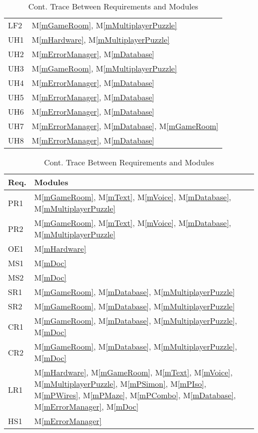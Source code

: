 \documentclass[12pt, titlepage]{article}
\newcommand{\mref}[1]{M\ref{#1}}
\begin{document}
\begin{table}[H]
\begin{tabular}{p{} p{}}
LF2 & \mref{mGameRoom}, \mref{mMultiplayerPuzzle}\\
UH1 & \mref{mHardware}, \mref{mMultiplayerPuzzle}\\
UH2 & \mref{mErrorManager}, \mref{mDatabase}\\
UH3 & \mref{mGameRoom}, \mref{mMultiplayerPuzzle}\\
UH4 & \mref{mErrorManager}, \mref{mDatabase}\\
UH5 & \mref{mErrorManager}, \mref{mDatabase}\\
UH6 & \mref{mErrorManager}, \mref{mDatabase}\\
UH7 & \mref{mErrorManager}, \mref{mDatabase}, \mref{mGameRoom}\\
UH8 & \mref{mErrorManager}, \mref{mDatabase}\\


\bottomrule
\end{tabular}
\caption{Cont. Trace Between Requirements and Modules}
\label{TblRT2}
\end{table}

\begin{table}[H]
\centering
\begin{tabular}{p{} p{}}
\toprule
\textbf{Req.} & \textbf{Modules}\\
\midrule
PR1 & \mref{mGameRoom}, \mref{mText}, \mref{mVoice}, \mref{mDatabase}, \mref{mMultiplayerPuzzle}\\
PR2 & \mref{mGameRoom}, \mref{mText}, \mref{mVoice}, \mref{mDatabase}, \mref{mMultiplayerPuzzle}\\
OE1     & \mref{mHardware}\\
MS1& \mref{mDoc}\\
MS2& \mref{mDoc}\\
SR1 & \mref{mGameRoom}, \mref{mDatabase}, \mref{mMultiplayerPuzzle}\\
SR2 & \mref{mGameRoom}, \mref{mDatabase}, \mref{mMultiplayerPuzzle}\\
CR1 & \mref{mGameRoom}, \mref{mDatabase}, \mref{mMultiplayerPuzzle}, \mref{mDoc}\\
CR2 & \mref{mGameRoom}, \mref{mDatabase}, \mref{mMultiplayerPuzzle}, \mref{mDoc}\\
LR1     & \mref{mHardware}, \mref{mGameRoom}, \mref{mText}, \mref{mVoice},  \mref{mMultiplayerPuzzle}, \mref{mPSimon}, \mref{mPIso}, \mref{mPWires}, \mref{mPMaze}, \mref{mPCombo}, \mref{mDatabase}, \mref{mErrorManager}, \mref{mDoc}\\
HS1     & \mref{mErrorManager}\\
\bottomrule
\end{tabular}
\caption{Cont. Trace Between Requirements and Modules}
\label{TblRT3}
\end{table}
\end{document}
